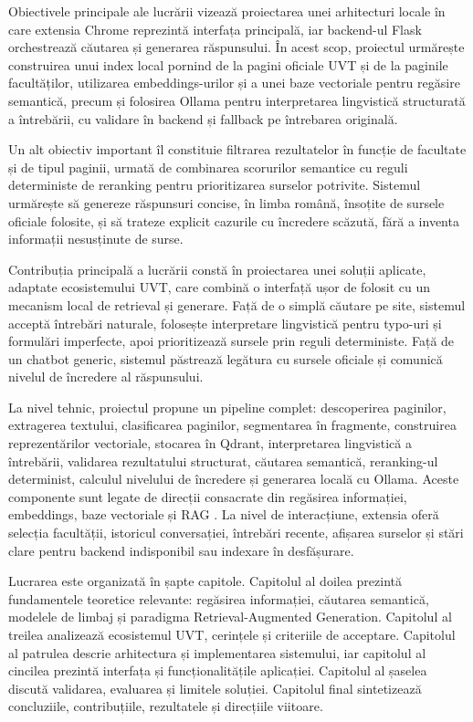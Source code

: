 \documentclass[12pt,a4paper]{report}
\theoremstyle{definition}
\theoremstyle{remark}
\begin{document}
Obiectivele principale ale lucrării vizează proiectarea unei arhitecturi locale în care extensia Chrome reprezintă interfața principală, iar backend-ul Flask orchestrează căutarea și generarea răspunsului. În acest scop, proiectul urmărește construirea unui index local pornind de la pagini oficiale UVT și de la paginile facultăților, utilizarea embeddings-urilor și a unei baze vectoriale pentru regăsire semantică, precum și folosirea Ollama pentru interpretarea lingvistică structurată a întrebării, cu validare în backend și fallback pe întrebarea originală.

Un alt obiectiv important îl constituie filtrarea rezultatelor în funcție de facultate și de tipul paginii, urmată de combinarea scorurilor semantice cu reguli deterministe de reranking pentru prioritizarea surselor potrivite. Sistemul urmărește să genereze răspunsuri concise, în limba română, însoțite de sursele oficiale folosite, și să trateze explicit cazurile cu încredere scăzută, fără a inventa informații nesusținute de surse.

Contribuția principală a lucrării constă în proiectarea unei soluții aplicate, adaptate ecosistemului UVT, care combină o interfață ușor de folosit cu un mecanism local de retrieval și generare. Față de o simplă căutare pe site, sistemul acceptă întrebări naturale, folosește interpretare lingvistică pentru typo-uri și formulări imperfecte, apoi prioritizează sursele prin reguli deterministe. Față de un chatbot generic, sistemul păstrează legătura cu sursele oficiale și comunică nivelul de încredere al răspunsului.

La nivel tehnic, proiectul propune un pipeline complet: descoperirea paginilor, extragerea textului, clasificarea paginilor, segmentarea în fragmente, construirea reprezentărilor vectoriale, stocarea în Qdrant, interpretarea lingvistică a întrebării, validarea rezultatului structurat, căutarea semantică, reranking-ul determinist, calculul nivelului de încredere și generarea locală cu Ollama. Aceste componente sunt legate de direcții consacrate din regăsirea informației, embeddings, baze vectoriale și RAG \cite{Manning2008IR,Reimers2019SBERT,QdrantDocs,OllamaDocs}. La nivel de interacțiune, extensia oferă selecția facultății, istoricul conversației, întrebări recente, afișarea surselor și stări clare pentru backend indisponibil sau indexare în desfășurare.

Lucrarea este organizată în șapte capitole. Capitolul al doilea prezintă fundamentele teoretice relevante: regăsirea informației, căutarea semantică, modelele de limbaj și paradigma Retrieval-Augmented Generation. Capitolul al treilea analizează ecosistemul UVT, cerințele și criteriile de acceptare. Capitolul al patrulea descrie arhitectura și implementarea sistemului, iar capitolul al cincilea prezintă interfața și funcționalitățile aplicației. Capitolul al șaselea discută validarea, evaluarea și limitele soluției. Capitolul final sintetizează concluziile, contribuțiile, rezultatele și direcțiile viitoare.
\end{document}
